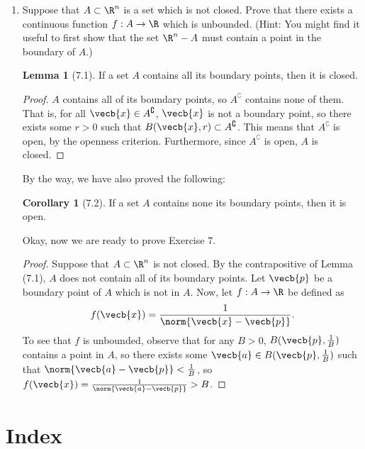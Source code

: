 \documentclass[a5paper]{article}
\theoremstyle{definition}%
\newtheorem*{corollary*}{Corollary}
\newtheorem*{lemma*}{Lemma}
\numberwithin{exercise}{section}
\theoremstyle{remark}%
\begin{document}
\begin{enumerate}
\item Suppose that $A \subset \R^n$ is a set which is not closed. Prove that there exists a continuous function $f:A\to\R$ which is unbounded. (Hint: You might find it useful to first show that the set $\R^n-A$ must contain a point in the boundary of $A$.)
\begin{lemma*}[7.1]
If a set $A$ contains all its boundary points, then it is closed. 
\end{lemma*}
\begin{proof}
$A$ contains all of its boundary points, so $A^\complement$ contains none of them. That is, for all $\vecb{x}\in A^\complement$, $\vecb{x}$ is not a boundary point, so there exists some $r>0$ such that $B(\vecb{x}, r)\subset A^\complement$. This means that $A^\complement$ is open, by the openness criterion. Furthermore, since $A^\complement$ is open, $A$ is closed. 
\end{proof}
By the way, we have also proved the following:
\begin{corollary*}[7.2]
If a set $A$ contains none its boundary points, then it is open.
\end{corollary*}
Okay, now we are ready to prove Exercise 7. 
\begin{proof}
Suppose that $A \subset \R^n$ is not closed. By the contrapositive of Lemma (7.1), $A$ does not contain all of its boundary points. Let $\vecb{p}$ be a boundary point of $A$ which is not in $A$. Now, let $f:A\to\R$ be defined as 
$$f(\vecb{x})=\frac{1}{\norm{\vecb{x}-\vecb{p}}}.$$
To see that $f$ is unbounded, observe that for any $B>0$, $B(\vecb{p},\frac{1}{B})$ contains a point in $A$, so there exists some $\vecb{a}\in B(\vecb{p},\frac{1}{B})$ such that $\norm{\vecb{a}-\vecb{p}}<\frac{1}{B}$, so $f(\vecb{x})=\frac{1}{\norm{\vecb{a}-\vecb{p}}}>B$. 
\end{proof}
\end{enumerate}


\pagebreak
\section{Index}
\printindex
\end{document}
